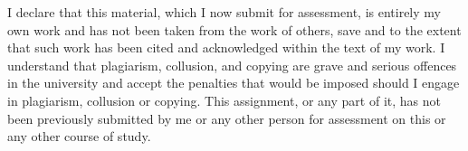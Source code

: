 \documentclass[runningheads]{llncs}
\begin{document}
I declare that this material, which I now submit for assessment, is entirely my own work and has not been taken from the work of others, save and to the extent that such work has been cited and acknowledged within the text of my work. I understand that plagiarism, collusion, and copying are grave and serious offences in the university and accept the penalties that would be imposed should I engage in plagiarism, collusion or copying. This assignment, or any part of it, has not been previously submitted by me or any other person for assessment on this or any other course of study.
\end{document}
